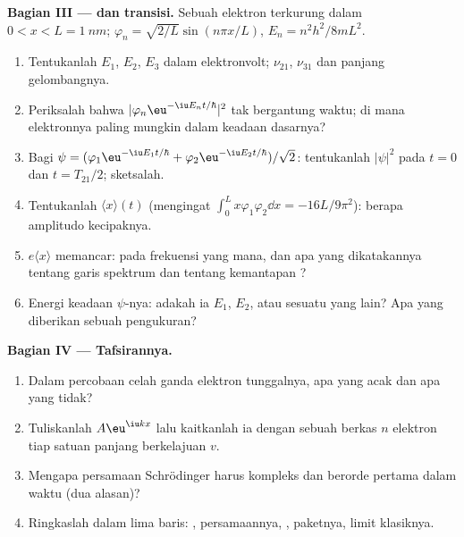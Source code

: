 \begin{problem}
\textbf{Bagian III ---  dan transisi.}
Sebuah elektron terkurung dalam $0 < x < L = \qty{1}{nm}$; $\varphi_n =
\sqrt{2/L}\sin(n\pi x/L)$, $E_n = n^2h^2/8mL^2$.
\begin{enumerate}[resume]
  \item Tentukanlah $E_1$, $E_2$, $E_3$ dalam elektronvolt; 
        $\nu_{21}$, $\nu_{31}$ dan panjang gelombangnya.
  \item Periksalah bahwa $|\varphi_n\eu^{-\iu E_nt/\hbar}|^2$ tak bergantung waktu;
        di mana elektronnya paling mungkin dalam keadaan dasarnya?
  \item Bagi $\psi = (\varphi_1\eu^{-\iu E_1t/\hbar} + \varphi_2\eu^{-\iu E_2t/\hbar})/
        \sqrt2$: tentukanlah $|\psi|^2$ pada $t = 0$ dan $t = T_{21}/2$; sketsalah.
  \item Tentukanlah $\langle x\rangle(t)$ (mengingat $\int_0^Lx\varphi_1\varphi_2\dd x = -16L/9\pi^2$):
        berapa amplitudo kecipaknya.
  \item {} $e\langle x\rangle$ memancar: pada frekuensi yang
        mana, dan apa yang dikatakannya tentang garis spektrum dan
        tentang kemantapan ?
  \item Energi keadaan $\psi$-nya: adakah ia $E_1$, $E_2$, atau sesuatu yang
        lain? Apa yang diberikan sebuah pengukuran?
\end{enumerate}

\textbf{Bagian IV --- Tafsirannya.}
\begin{enumerate}[resume]
  \item Dalam percobaan celah ganda elektron tunggalnya, apa yang acak
        dan apa yang tidak?
  \item Tuliskanlah  $A\eu^{\iu kx}$ lalu kaitkanlah ia dengan
        sebuah berkas $n$ elektron tiap satuan panjang berkelajuan $v$.
  \item Mengapa persamaan Schrödinger harus kompleks dan berorde pertama
        dalam waktu (dua alasan)?
  \item Ringkaslah dalam lima baris: , persamaannya,
        , paketnya, limit klasiknya.
\end{enumerate}
\end{problem}
